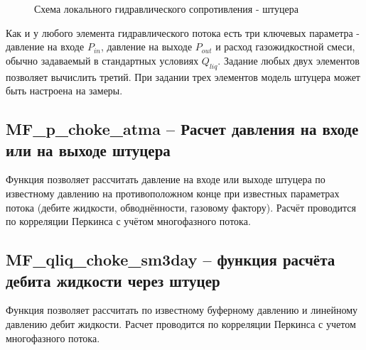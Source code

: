 \begin{figure}[h!]
\begin{center}
	
		\caption{Схема локального гидравлического сопротивления - штуцера}
		\label{ris:Pipe_choke}
		
	\end{center}
\end{figure}



Как и у любого элемента гидравлического потока есть три ключевых параметра - давление на входе \( P_{in} \), давление на выходе \(P_{out}\)  и расход газожидкостной смеси, обычно задаваемый в стандартных условиях \(Q_{liq} \). Задание любых двух элементов позволяет вычислить третий. При задании трех элементов модель штуцера может быть настроена на замеры.
 

\subsection{MF\_p\_choke\_atma – Расчет давления на входе или на выходе штуцера}
Функция позволяет рассчитать давление на входе или выходе штуцера по известному давлению на противоположном конце при известных параметрах потока (дебите жидкости, обводнённости, газовому фактору). Расчёт проводится по корреляции Перкинса \cite{Perkins_1993} с учётом многофазного потока. 
 



\subsection{MF\_qliq\_choke\_sm3day – функция расчёта дебита жидкости через штуцер}
Функция позволяет рассчитать по известному буферному давлению и линейному давлению дебит жидкости. Расчет проводится по корреляции Перкинса \cite{Perkins_1993} с учетом многофазного потока.  

